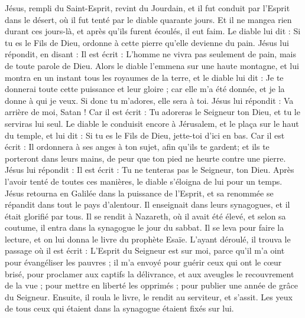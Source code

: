 \begin{multicols}{2}
\VerseOne{}Jésus, rempli du Saint-Esprit, revint du Jourdain, et il fut conduit par l'Esprit dans le désert,
où il fut tenté par le diable quarante jours. Et il ne mangea rien durant ces jours-là, et après qu'ils furent écoulés, il eut faim.
Le diable lui dit : Si tu es le Fils de Dieu, ordonne à cette pierre qu'elle devienne du pain.
Jésus lui répondit, en disant : Il est écrit : L’homme ne vivra pas seulement de pain, mais de toute parole de Dieu.
Alors le diable l'emmena sur une haute montagne, et lui montra en un instant tous les royaumes de la terre,
et le diable lui dit : Je te donnerai toute cette puissance et leur gloire ; car elle m'a été donnée, et je la donne à qui je veux.
Si donc tu m’adores, elle sera à toi.
Jésus lui répondit : Va arrière de moi, Satan ! Car il est écrit : Tu adoreras le Seigneur ton Dieu, et tu le serviras lui seul.
Le diable le conduisit encore à Jérusalem, et le plaça sur le haut du temple, et lui dit : Si tu es le Fils de Dieu, jette-toi d'ici en bas.
Car il est écrit : Il ordonnera à ses anges à ton sujet, afin qu’ils te gardent;
et ils te porteront dans leurs mains, de peur que ton pied ne heurte contre une pierre.
Jésus lui répondit : Il est écrit : Tu ne tenteras pas le Seigneur, ton Dieu.
Après l’avoir tenté de toutes ces manières, le diable s’éloigna de lui pour un temps.
Jésus retourna en Galilée dans la puissance de l'Esprit, et sa renommée se répandit dans tout le pays d'alentour.
Il enseignait dans leurs synagogues, et il était glorifié par tous.
Il se rendit à Nazareth, où il avait été élevé, et selon sa coutume, il entra dans la synagogue le jour du sabbat. Il se leva pour faire la lecture,
et on lui donna le livre du prophète Esaïe. L’ayant déroulé, il trouva le passage où il est écrit :
L'Esprit du Seigneur est sur moi, parce qu'il m'a oint pour évangéliser les pauvres ; il m’a envoyé pour guérir ceux qui ont le cœur brisé,
pour proclamer aux captifs la délivrance, et aux aveugles le recouvrement de la vue ; pour mettre en liberté les opprimés ; pour publier une année de grâce du Seigneur.
Ensuite, il roula le livre, le rendit au serviteur, et s'assit. Les yeux de tous ceux qui étaient dans la synagogue étaient fixés sur lui.

\end{multicols}
